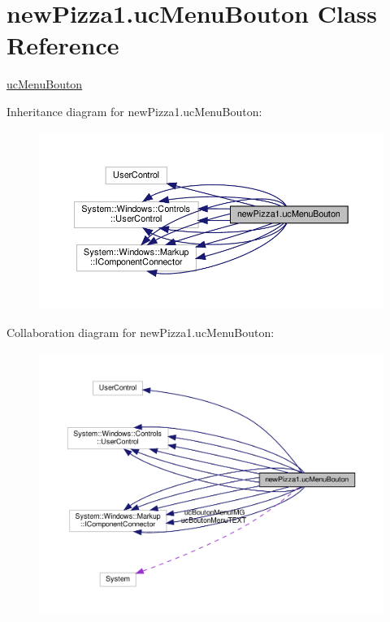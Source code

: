 \hypertarget{classnewPizza1_1_1ucMenuBouton}{}\section{new\+Pizza1.\+uc\+Menu\+Bouton Class Reference}
\label{classnewPizza1_1_1ucMenuBouton}


\hyperlink{classnewPizza1_1_1ucMenuBouton}{uc\+Menu\+Bouton}  




Inheritance diagram for new\+Pizza1.\+uc\+Menu\+Bouton\+:
\nopagebreak
\begin{figure}[H]
\begin{center}
\leavevmode
\includegraphics[width=350pt]{classnewPizza1_1_1ucMenuBouton__inherit__graph}
\end{center}
\end{figure}


Collaboration diagram for new\+Pizza1.\+uc\+Menu\+Bouton\+:
\nopagebreak
\begin{figure}[H]
\begin{center}
\leavevmode
\includegraphics[width=350pt]{classnewPizza1_1_1ucMenuBouton__coll__graph}
\end{center}
\end{figure}
